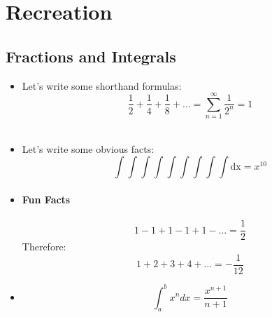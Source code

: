 \documentclass[paper=a4, fontsize=11pt]{scrartcl} %
\numberwithin{equation}{section} %
\numberwithin{figure}{section} %
\numberwithin{table}{section} %
\begin{document}
\section{Recreation}



\subsection{Fractions and Integrals}

\begin{itemize}
\item Let's write some shorthand formulas:\\

$$ \frac{1}{2} + \frac{1}{4} +\frac{1}{8} + \ldots =  \sum_{n=1}^{\infty}\frac{ 1 }{ 2 ^ n} = 1$$\\

\item Let's write some obvious facts:\\
$$ \int\int\int\int\int\int\int\int\int \mathrm{dx} =    x  ^{10}      $$

\item \paragraph{Fun Facts}

  $$ 1-1+1-1+1-\ldots = \frac{1}{2} $$
 Therefore:
 $$ 1+2+3+4+\ldots = -\frac{1}{12} $$

\item $$\int_{a}^{b} x^n dx = \frac{x ^{n+1}}{n+1} $$
\end{itemize}



\end{document}
